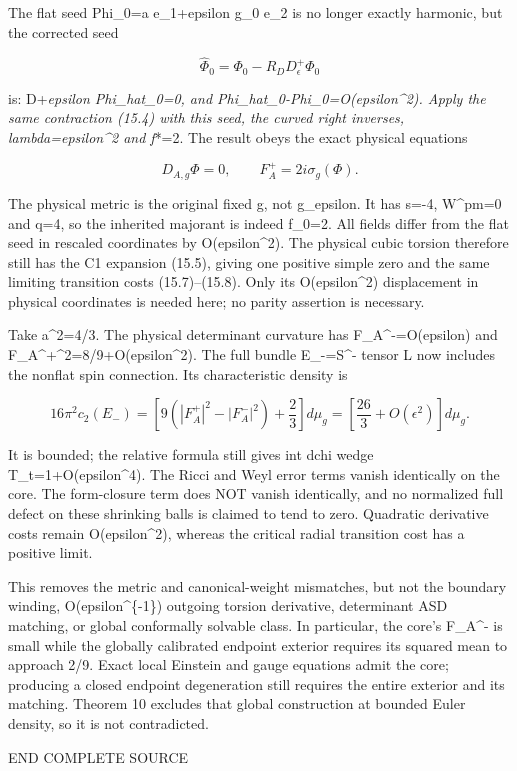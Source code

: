 \documentclass[
  10pt,
]{article}
\begin{document}
The flat seed Phi\_0=a e\_1+epsilon g\_0 e\_2 is no longer exactly
harmonic, but the corrected seed

\[
       \widehat\Phi_0=\Phi_0-R_D D_\epsilon^+\Phi_0
\]

is: D+\emph{epsilon Phi\_hat\_0=0, and
Phi\_hat\_0-Phi\_0=O(epsilon\^{}2). Apply the same contraction (15.4)
with this seed, the curved right inverses, lambda=epsilon\^{}2 and
f}*=2. The result obeys the exact physical equations

\[
            D_{A,g}\Phi=0,\qquad F_A^+=2i\sigma_g(\Phi).
                                                               \tag{15.10}
\]

The physical metric is the original fixed g, not g\_epsilon. It has
s=-4, W\^{}pm=0 and q=4, so the inherited majorant is indeed f\_0=2. All
fields differ from the flat seed in rescaled coordinates by
O(epsilon\^{}2). The physical cubic torsion therefore still has the C1
expansion (15.5), giving one positive simple zero and the same limiting
transition costs (15.7)--(15.8). Only its O(epsilon\^{}2) displacement
in physical coordinates is needed here; no parity assertion is
necessary.

Take a\^{}2=4/3. The physical determinant curvature has
F\_A\^{}-=O(epsilon) and
\textbar F\_A\^{}+\textbar\^{}2=8/9+O(epsilon\^{}2). The full bundle
E\_-=S\^{}- tensor L now includes the nonflat spin connection. Its
characteristic density is

\[
 16\pi^2c_2(E_-)
   =\left[9(|F_A^+|^2-|F_A^-|^2)+\frac23\right]d\mu_g
   =\left[\frac{26}{3}+O(\epsilon^2)\right]d\mu_g.
\]

It is bounded; the relative formula still gives int dchi wedge
T\_t=1+O(epsilon\^{}4). The Ricci and Weyl error terms vanish
identically on the core. The form-closure term does NOT vanish
identically, and no normalized full defect on these shrinking balls is
claimed to tend to zero. Quadratic derivative costs remain
O(epsilon\^{}2), whereas the critical radial transition cost has a
positive limit.

This removes the metric and canonical-weight mismatches, but not the
boundary winding, O(epsilon\^{}\{-1\}) outgoing torsion derivative,
determinant ASD matching, or global conformally solvable class. In
particular, the core's F\_A\^{}- is small while the globally calibrated
endpoint exterior requires its squared mean to approach 2/9. Exact local
Einstein and gauge equations admit the core; producing a closed endpoint
degeneration still requires the entire exterior and its matching.
Theorem 10 excludes that global construction at bounded Euler density,
so it is not contradicted.

END COMPLETE SOURCE
\end{document}
